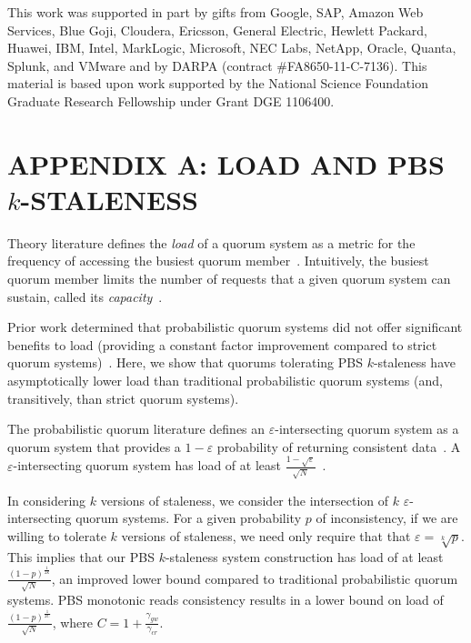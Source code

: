 \documentclass{vldb}
\newcommand{\sectionskip}{-0em}
\begin{document}
This work was supported in part by gifts from Google, SAP,
Amazon Web Services, Blue Goji, Cloudera, Ericsson, General Electric, 
Hewlett Packard, Huawei, IBM, Intel, MarkLogic, Microsoft, NEC Labs, 
NetApp, Oracle, Quanta, Splunk, and VMware and by DARPA 
(contract \#FA8650-11-C-7136).  This material is based upon
work supported by the National Science Foundation Graduate Research
Fellowship under Grant DGE 1106400.

{\small


}

\balance


\vspace{\sectionskip}
\section*{APPENDIX A: LOAD AND PBS {\large$k$}-STALENESS}
Theory literature defines the \textit{load} of a quorum system as a
metric for the frequency of accessing the busiest quorum
member~\cite[Definition 3.2]{quorumsystems}.  Intuitively, the busiest
quorum member limits the number of requests that a given quorum system
can sustain, called its \textit{capacity}~\cite[Corollary
  3.9]{quorumsystems}.

Prior work determined that probabilistic quorum systems did not offer
significant benefits to load (providing a constant factor improvement
compared to strict quorum systems)~\cite{prob-quorum}.  Here, we show
that quorums tolerating PBS $k$-staleness have asymptotically lower
load than traditional probabilistic quorum systems (and, transitively,
than strict quorum systems).

The probabilistic quorum literature defines an
$\varepsilon$-intersecting quorum system as a quorum system that
provides a $1-\varepsilon$ probability of returning consistent
data~\cite[Definition 3.1]{prob-quorum}.  A $\varepsilon$-intersecting
quorum system has load of at least 
$\frac{1-\sqrt{\varepsilon}}{\sqrt{N}}$~\cite[Corollary
  3.12]{prob-quorum}.

In considering $k$ versions of staleness, we consider the intersection
of $k$ $\varepsilon$-intersecting quorum systems.  For a given
probability $p$ of inconsistency, if we are willing to tolerate $k$
versions of staleness, we need only require that that $\varepsilon =
\sqrt[k]{p}$.  This implies that our PBS $k$-staleness system
construction has load of at least
$\frac{(1-p)^{\frac{1}{2k}}}{\sqrt{N}}$, an improved lower bound
compared to traditional probabilistic quorum systems.  PBS monotonic
reads consistency results in a lower bound on load of
$\frac{(1-p)^{\frac{1}{2C}}}{\sqrt{N}}$, where
$C=1+\frac{\gamma_{gw}}{\gamma_{cr}}$.
\end{document}
